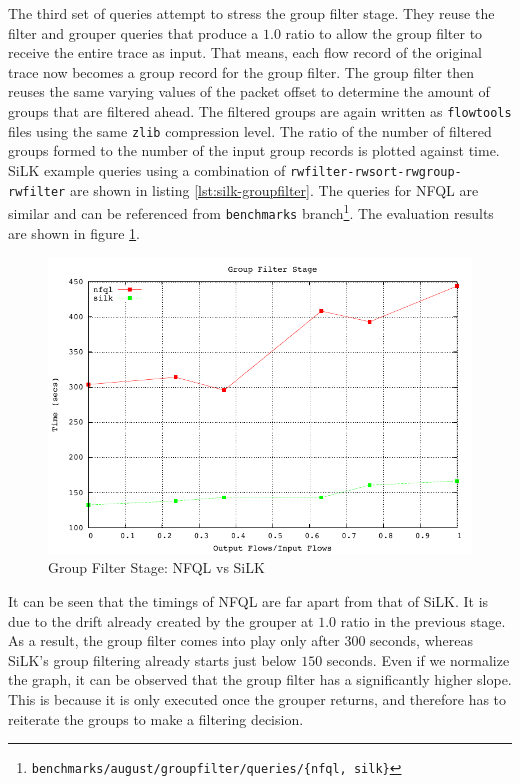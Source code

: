 The third set of queries attempt to stress the group filter stage. They reuse
the filter and grouper queries that produce a $1.0$ ratio to allow the group
filter to receive the entire trace as input. That means, each flow record of
the original trace now becomes a group record for the group filter.  The group
filter then reuses the same varying values of the packet offset to determine
the amount of groups that are filtered ahead. The filtered groups
 are again written as \texttt{flowtools}
files using the same \texttt{zlib} compression level. The ratio of the number
of filtered groups formed to the number of the input group records is plotted
against time. SiLK example queries using a combination of
\texttt{rwfilter-rwsort-rwgroup-rwfilter} are shown in listing
\ref{lst:silk-groupfilter}.  The queries for \ac{NFQL} are similar and can be
referenced from \texttt{benchmarks}
branch\footnote{\texttt{benchmarks/august/groupfilter/queries/\{nfql,
silk\}}}.  The evaluation results are shown in figure
\ref{fig:benchmarks-groupfilter}.

\begin{figure}[h!]
  \begin{center}
    \includegraphics* [width=0.8\linewidth]{figures/benchmarks/groupfilter}
    \caption{Group Filter Stage: NFQL vs SiLK}
    \label{fig:benchmarks-groupfilter}
  \end{center}
\end{figure}

It can be seen that the timings of \ac{NFQL} are far apart from that of SiLK.
It is due to the drift already created by the grouper at $1.0$ ratio in the
previous stage.  As a result,
the group filter comes into play only after $300$ seconds, whereas SiLK's
group filtering already starts just below $150$ seconds. Even if we normalize
the graph, it can be observed that the group filter has a significantly higher
slope. This is because it is only executed once the grouper returns, and
therefore has to reiterate the groups to make a filtering decision.

